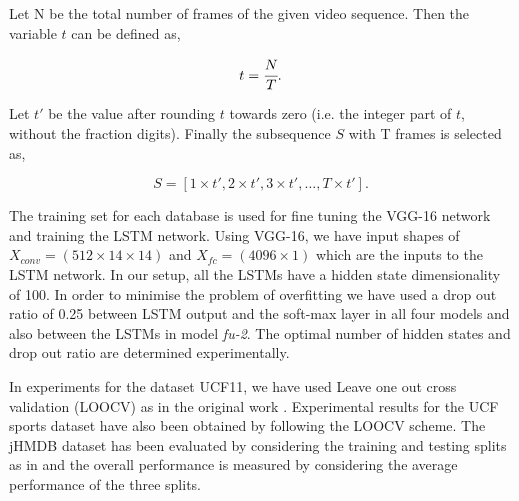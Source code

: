 \documentclass[10pt,twocolumn,letterpaper]{article}
\begin{document}
Let N be the total number of frames of the given video sequence. Then the variable $t$ can be defined as,

\begin{equation}\label{eq:1}
t=\cfrac{N}{T}.
\end{equation}
 
 Let $t'$ be the value after rounding $t$ towards zero (i.e. the integer part of $t$, without the fraction digits). Finally the subsequence $S$ with T frames is selected as,

\begin{equation}\label{eq:1}
S=[1\times{t'}, 2\times{t'},3\times{t'},\ldots,T\times{t'}].
\end{equation}
 

The training set for each database is used for fine tuning the VGG-16 network and training the LSTM network. Using VGG-16, we have input shapes of $X_{conv}=(512\times{14\times{14}})$ and $X_{fc}=(4096\times{1})$ which are the inputs to the LSTM network. In our setup, all the LSTMs have a hidden state dimensionality of 100. In order to minimise the problem of overfitting we have used a drop out ratio of 0.25 between LSTM output and the soft-max layer in all four models and also between the LSTMs in model \textit{fu-2}. The optimal number of hidden states and drop out ratio are determined experimentally. 

In experiments for the dataset UCF11, we have used Leave one out cross validation (LOOCV) as in the original work \cite{UCF11wild}. Experimental results for the UCF sports dataset have also been obtained by following the LOOCV scheme. The jHMDB dataset has been evaluated by considering the training and testing splits as in \cite{jHMDB2013} and the overall performance is measured by considering the average performance of the three splits.   
\end{document}

